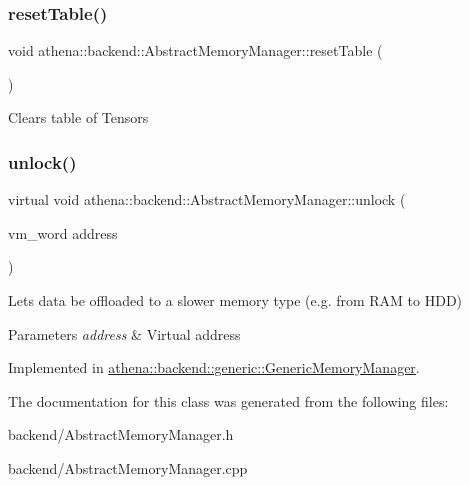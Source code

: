 \subsubsection{\texorpdfstring{reset\+Table()}{resetTable()}}
{\footnotesize\ttfamily void athena\+::backend\+::\+Abstract\+Memory\+Manager\+::reset\+Table (\begin{DoxyParamCaption}{ }\end{DoxyParamCaption})}

Clears table of Tensors \mbox{\label{classathena_1_1backend_1_1_abstract_memory_manager_aec859ee3bf6011d8710b2ec4bfc2373e}} 
\subsubsection{\texorpdfstring{unlock()}{unlock()}}
{\footnotesize\ttfamily virtual void athena\+::backend\+::\+Abstract\+Memory\+Manager\+::unlock (\begin{DoxyParamCaption}\item[{vm\+\_\+word}]{address }\end{DoxyParamCaption})\hspace{0.3cm}{\ttfamily [pure virtual]}}

Lets data be offloaded to a slower memory type (e.\+g. from R\+AM to H\+DD) 
\begin{DoxyParams}{Parameters}
{\em address} & Virtual address \\
\hline
\end{DoxyParams}


Implemented in \mbox{\hyperlink{classathena_1_1backend_1_1generic_1_1_generic_memory_manager_a58a2b56a07a96c3cabb7b8fd079b3eae}{athena\+::backend\+::generic\+::\+Generic\+Memory\+Manager}}.



The documentation for this class was generated from the following files\+:\begin{DoxyCompactItemize}
\item 
backend/Abstract\+Memory\+Manager.\+h\item 
backend/Abstract\+Memory\+Manager.\+cpp\end{DoxyCompactItemize}
